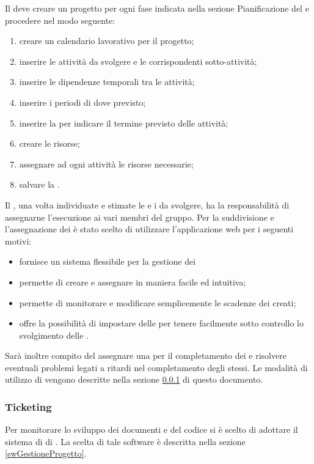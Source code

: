 \documentclass[12pt,a4paper]{article}
\begin{document}
\label{projeclibre}
Il \PM deve creare un progetto per ogni fase indicata nella sezione Pianificazione del \PdP{} e procedere nel modo seguente:
\begin{enumerate}
	\item creare un calendario lavorativo per il progetto;
	\item inserire le attività da svolgere e le corrispondenti sotto-attività;
	\item inserire le dipendenze temporali tra le attività;
	\item inserire i periodi di  dove previsto;
	\item inserire la  per indicare il termine previsto delle attività;
	\item creare le risorse;
	\item assegnare ad ogni attività le risorse necessarie;
	\item salvare la .
\end{enumerate}

\label{swGestioneProgetto}
Il \PM{}, una volta individuate e stimate le  e i  da svolgere, ha la responsabilità di assegnarne l'esecuzione ai vari membri del gruppo. Per la suddivisione e l'assegnazione dei  è stato scelto di utilizzare l'applicazione web  per i seguenti motivi: 
\begin{itemize}
	\item fornisce un sistema flessibile per la gestione dei 
	\item permette di creare e assegnare  in maniera facile ed intuitiva; 
	\item permette di monitorare e modificare semplicemente le scadenze dei  creati;
	\item offre la possibilità di impostare delle  per tenere facilmente sotto controllo lo svolgimento delle .
\end{itemize}
Sarà inoltre compito del \PM{} assegnare una  per il completamento dei  e risolvere eventuali problemi legati a ritardi nel completamento degli stessi.
Le modalità di utilizzo di  vengono descritte nella sezione \ref{ticket} di questo documento.

\subsubsection{Ticketing}\label{ticket} %
Per monitorare lo sviluppo dei documenti e del codice si è scelto di adottare il sistema di  di . La scelta di tale software è descritta nella sezione \ref{swGestioneProgetto}.
\end{document}
